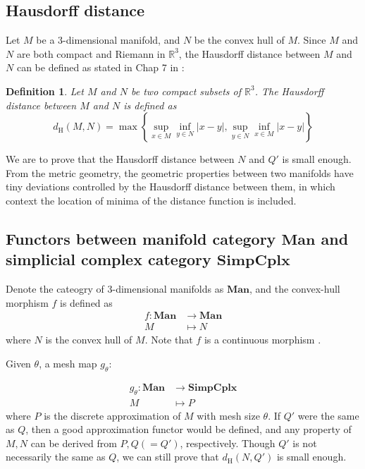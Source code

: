 \documentclass{article}
\newtheorem{definition}{Definition}
\begin{document}
\subsection{Hausdorff distance}
Let $M$ be a $3$-dimensional manifold, and $N$ be the convex hull of $M$. Since $M$ and $N$ are both compact and Riemann in $\mathbb{R}^3$, the Hausdorff distance between $M$ and $N$ can be defined as stated in Chap 7 in \cite{gromov1981groups}:

\begin{definition}
  Let $M$ and $N$ be two compact subsets of $\mathbb{R}^3$. The Hausdorff distance between $M$ and $N$ is defined as
  $$
    d_{\text{H}}(M, N) = \max \left\{ \sup_{x \in M} \inf_{y \in N} |x - y|, \sup_{y \in N} \inf_{x \in M} |x - y| \right\}
  $$
\end{definition}

We are to prove that the Hausdorff distance between $N$ and $Q'$ is small enough. From the metric geometry, the geometric properties between two manifolds have tiny deviations controlled by the Hausdorff distance between them, in which context the location of minima of the distance function is included.

\subsection{Functors between manifold category $\mathbf{Man}$ and simplicial complex category $\mathbf{SimpCplx}$}

Denote the cateogry of $3$-dimensional manifolds as $\mathbf{Man}$, and the convex-hull morphism $f$ is defined as
$$
  \begin{aligned}
    f: \mathbf{Man} & \rightarrow \mathbf{Man} \\
    M               & \mapsto N
  \end{aligned}
$$ where $N$ is the convex hull of $M$. Note that $f$ is a continuous morphism \cite{bobenko2016advances}.

Given $\theta$, a mesh map $g_\theta$:

$$
  \begin{aligned}
    g_\theta: \mathbf{Man} & \rightarrow \mathbf{SimpCplx} \\
    M                      & \mapsto P
  \end{aligned}
$$ where $P$ is the discrete approximation of $M$ with mesh size $\theta$. If $Q'$ were the same as $Q$, then a good approximation functor would be defined, and any property of $M, N$ can be derived from $P, Q(=Q')$, respectively. Though $Q'$ is not necessarily the same as $Q$, we can still prove that $d_{\text{H}}(N, Q')$ is small enough.
\end{document}
